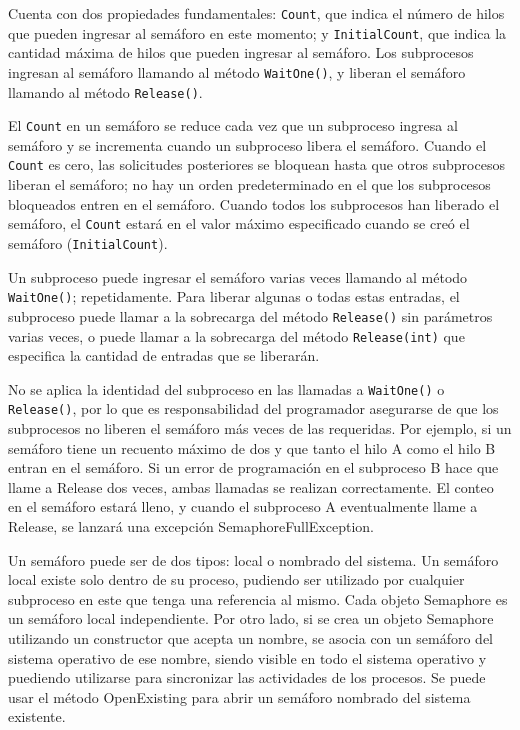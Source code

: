 \documentclass[10pt]{article} %
\newcommand{\csl}[1]{\colorbox{backcolour}{\texttt{#1}}}
\begin{document}
Cuenta con dos propiedades fundamentales: \csl{Count}, que indica el n\'umero de hilos que pueden ingresar al sem\'aforo en este momento; y \csl{InitialCount}, que indica la cantidad m\'axima de hilos que pueden ingresar al sem\'aforo. Los subprocesos ingresan al semáforo llamando al método \csl{WaitOne()}, y liberan el semáforo llamando al método \csl{Release()}.

El \csl{Count} en un semáforo se reduce cada vez que un subproceso ingresa al semáforo y se incrementa cuando un subproceso libera el semáforo. Cuando el \csl{Count} es cero, las solicitudes posteriores se bloquean hasta que otros subprocesos liberan el semáforo; no hay un orden predeterminado en el que los subprocesos bloqueados entren en el semáforo. Cuando todos los subprocesos han liberado el semáforo, el \csl{Count} estar\'a en el valor máximo especificado cuando se creó el semáforo (\csl{InitialCount}).

Un subproceso puede ingresar el semáforo varias veces llamando al método \csl{WaitOne()}; repetidamente. Para liberar algunas o todas estas entradas, el subproceso puede llamar a la sobrecarga del método \csl{Release()} sin parámetros varias veces, o puede llamar a la sobrecarga del método \csl{Release(int)} que especifica la cantidad de entradas que se liberarán.

No se aplica la identidad del subproceso en las llamadas a \csl{WaitOne()} o \csl{Release()}, por lo que es responsabilidad del programador asegurarse de que los subprocesos no liberen el semáforo m\'as veces de las requeridas. Por ejemplo, si un semáforo tiene un recuento máximo de dos y que tanto el hilo A como el hilo B entran en el semáforo. Si un error de programación en el subproceso B hace que llame a Release dos veces, ambas llamadas se realizan correctamente. El conteo en el semáforo estar\'a lleno, y cuando el subproceso A eventualmente llame a Release, se lanzar\'a una excepci\'on SemaphoreFullException.

Un sem\'aforo puede ser de dos tipos: local o nombrado del sistema. Un semáforo local existe solo dentro de su proceso, pudiendo ser utilizado por cualquier subproceso en este que tenga una referencia al mismo. Cada objeto Semaphore es un semáforo local independiente. Por otro lado, si se crea un objeto Semaphore utilizando un constructor que acepta un nombre, se asocia con un semáforo del sistema operativo de ese nombre, siendo visible en todo el sistema operativo y puediendo utilizarse para sincronizar las actividades de los procesos. Se puede usar el método OpenExisting para abrir un semáforo nombrado del sistema existente.
\end{document}
